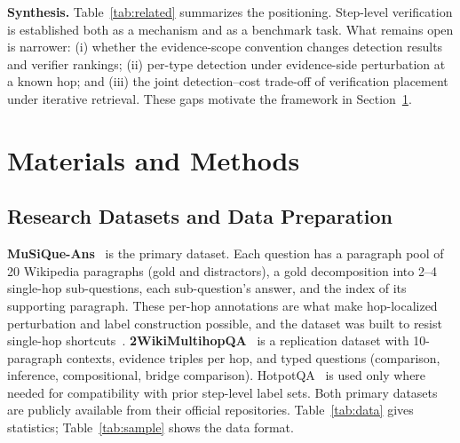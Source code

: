 \documentclass[conference]{IEEEtran}
\begin{document}
\textbf{Synthesis.}
Table~\ref{tab:related} summarizes the positioning. Step-level verification is established both as a mechanism and as a benchmark task. What remains open is narrower: (i) whether the evidence-scope convention changes detection results and verifier rankings; (ii) per-type detection under evidence-side perturbation at a known hop; and (iii) the joint detection--cost trade-off of verification placement under iterative retrieval. These gaps motivate the framework in Section~\ref{sec:methods}.

\section{Materials and Methods}\label{sec:methods}
\subsection{Research Datasets and Data Preparation}\label{sec:data}

\textbf{MuSiQue-Ans}~\cite{trivedi2022musique} is the primary dataset. Each question has a paragraph pool of 20 Wikipedia paragraphs (gold and distractors), a gold decomposition into 2--4 single-hop sub-questions, each sub-question's answer, and the index of its supporting paragraph. These per-hop annotations are what make hop-localized perturbation and label construction possible, and the dataset was built to resist single-hop shortcuts~\cite{min2019compositional}. \textbf{2WikiMultihopQA}~\cite{ho2020twowiki} is a replication dataset with 10-paragraph contexts, evidence triples per hop, and typed questions (comparison, inference, compositional, bridge comparison). HotpotQA~\cite{yang2018hotpotqa} is used only where needed for compatibility with prior step-level label sets. Both primary datasets are publicly available from their official repositories. Table~\ref{tab:data} gives statistics; Table~\ref{tab:sample} shows the data format.

\begin{table}[t]
\caption{Dataset statistics. $^{\dagger}$Train and dev counts verified on the downloaded MuSiQue v1.0 files; other split sizes as reported in the dataset papers. Sample sizes are those used here.}\label{tab:data}
\centering\small
{}
\end{table}
\end{document}
